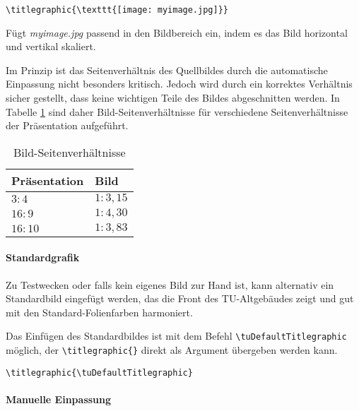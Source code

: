 \begin{Example}
  \begin{lstlisting}
\titlegraphic{\texttt{[image: myimage.jpg]}}
  \end{lstlisting}
  Fügt \textit{myimage.jpg} passend in den Bildbereich ein, indem es das Bild
  horizontal und vertikal skaliert.
\end{Example}

Im Prinzip ist das Seitenverhältnis des Quellbildes durch die automatische
Einpassung nicht besonders kritisch. Jedoch wird durch ein korrektes Verhältnis
sicher gestellt, dass keine wichtigen Teile des Bildes abgeschnitten werden.
In Tabelle \ref{tab:picratio} sind daher Bild-Seiten\-verhältnisse für
verschiedene Seitenverhältnisse der Präsentation aufgeführt.

\begin{table}[ht]
\centering
\begin{tabular}{ll}
\toprule
\bfseries Präsentation  & \bfseries  Bild  \\
\midrule
$3:4$   & $1:3{,}15$ \\
$16:9$  & $1:4{,}30$ \\
$16:10$ & $1:3{,}83$ \\
\bottomrule
\end{tabular}
\caption{Bild-Seitenverhältnisse}
\label{tab:picratio}
\end{table}



\paragraph{Standardgrafik}

Zu Testwecken oder falls kein eigenes Bild zur Hand ist,
kann alternativ ein Standardbild eingefügt werden, das die Front
des TU-Altgebäudes zeigt und gut mit den Standard-Folienfarben harmoniert.

Das Einfügen des Standardbildes ist mit dem Befehl
\linebreak\lstinline{\tuDefaultTitlegraphic} möglich,
der \lstinline!\titlegraphic{}! direkt als Argument übergeben werden kann.

\begin{example}
\begin{lstlisting}
\titlegraphic{\tuDefaultTitlegraphic}
\end{lstlisting}
\end{example}


\paragraph{Manuelle Einpassung}\hfill

